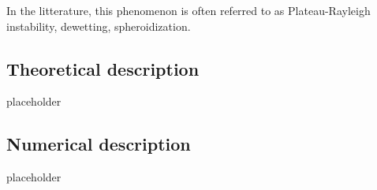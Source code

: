 In the litterature, this phenomenon is often referred to as Plateau-Rayleigh instability, dewetting, spheroidization. 
\subsection{Theoretical description}
        placeholder
\subsection{Numerical description}
        placeholder